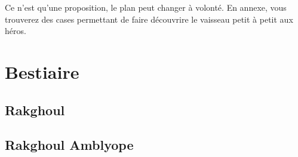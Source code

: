 \documentclass{jdrp}
\begin{document}
Ce n'est qu'une proposition, le plan peut changer à volonté. En annexe, vous trouverez des cases permettant de faire découvrire le vaisseau petit à petit aux héros.

\clearpage
\section{Bestiaire}

\subsection{Rakghoul}
\label{sec:rakghoul}


\subsection{Rakghoul Amblyope}
\label{sec:rakghoul-amblyope}


	\onecolumn
	\nocite{*}
	\printbibliography
\end{document}
